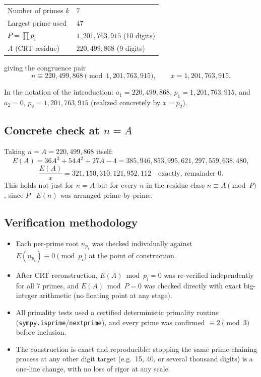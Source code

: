 \documentclass[11pt]{article}
\begin{document}
\begin{center}
\begin{tabular}{ll}
\toprule
Number of primes $k$ & $7$ \\
Largest prime used & $47$ \\
$P = \prod p_i$ & $1{,}201{,}763{,}915$ \quad (10 digits) \\
$A$ (CRT residue) & $220{,}499{,}868$ \quad (9 digits) \\
\bottomrule
\end{tabular}
\end{center}

\noindent giving the congruence pair
\[
n \equiv 220{,}499{,}868 \pmod{1{,}201{,}763{,}915}, \qquad
x = 1{,}201{,}763{,}915 .
\]

\noindent In the notation of the introduction: $a_1 = 220{,}499{,}868$,
$p_1 = 1{,}201{,}763{,}915$, and $a_2 = 0$, $p_2 = 1{,}201{,}763{,}915$
(realized concretely by $x = p_2$).

\subsection*{Concrete check at $n=A$}
Taking $n = A = 220{,}499{,}868$ itself:
\[
E(A) = 36A^3+54A^2+27A-4 = 385{,}946{,}853{,}995{,}621{,}297{,}559{,}638{,}480,
\]
\[
\frac{E(A)}{x} = 321{,}150{,}310{,}121{,}952{,}112 \quad \text{exactly, remainder } 0.
\]
This holds not just for $n=A$ but for every $n$ in the residue class
$n \equiv A \pmod P$, since $P \mid E(n)$ was arranged prime-by-prime.

\subsection*{Verification methodology}
\begin{itemize}[nosep]
\item Each per-prime root $n_{p_i}$ was checked individually against
$E(n_{p_i}) \equiv 0 \pmod{p_i}$ at the point of construction.
\item After CRT reconstruction, $E(A) \bmod p_i = 0$ was re-verified
independently for all 7 primes, and $E(A) \bmod P = 0$ was checked
directly with exact big-integer arithmetic (no floating point at any
stage).
\item All primality tests used a certified deterministic primality
routine (\texttt{sympy.isprime}/\texttt{nextprime}), and every prime was
confirmed $\equiv 2 \pmod 3$ before inclusion.
\item The construction is exact and reproducible: stopping the same
prime-chaining process at any other digit target (e.g.\ 15, 40, or
several thousand digits) is a one-line change, with no loss of rigor at
any scale.
\end{itemize}
\end{document}
